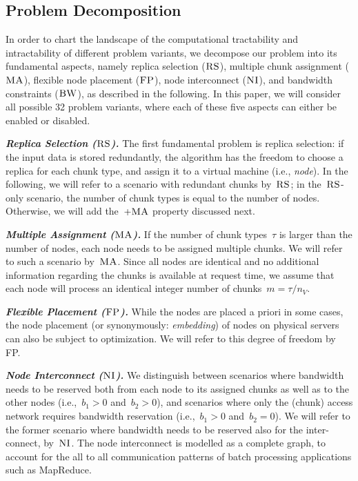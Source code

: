 \documentclass[preprint,12pt]{elsarticle}
\newcommand{\MaFactor}{m}
\newcommand{\capa}{\emph{cap}}
\newcommand{\CC}{\textsc{NI}}
\newcommand{\FP}{\textsc{FP}}
\newcommand{\RS}{\textsc{RS}}
\newcommand{\BW}{\textsc{BW}}
\newcommand{\MA}{\textsc{MA}}
\newcommand{\CostTrans}{\ensuremath{b_1}}
\newcommand{\CostCom}{\ensuremath{b_2}}
\begin{document}

\subsection{Problem Decomposition}

In order to chart the landscape of the computational tractability and intractability of different
problem variants, we decompose our problem into its fundamental aspects, namely replica selection
($\RS$), multiple chunk assignment ($\MA$), flexible node placement ($\FP$), node interconnect ($\CC$),
and bandwidth constraints ($\BW$), as described in the following. 
In this paper, we will consider all possible 32 problem variants, where each of these five aspects
can either be enabled or disabled. 

\textbf{\emph{Replica Selection ($\RS$).}} The first fundamental problem is replica selection:
if the input data is stored redundantly, the algorithm has the freedom to choose a replica
for each chunk type, and assign it to a virtual machine (i.e., \emph{node}).
In the following, we will refer to a scenario
with redundant chunks by~$\RS$; in the~$\RS$-only scenario, the number of chunk types
is equal to the number of nodes. Otherwise, we will add the~$+\MA$ property discussed next.

\textbf{\emph{Multiple Assignment ($\MA$).}}
If the number of chunk types~$\tau$ is larger than the number of nodes,
each node needs to be assigned multiple chunks. We will refer to such a scenario by~$\MA$. 
Since all nodes are identical and no additional information regarding the chunks is available at request time, we assume that each node will process an identical integer number of chunks~$\MaFactor = \tau / n_V$. 


\textbf{\emph{Flexible Placement ($\FP$).}} %
While the nodes are placed a priori in some cases, the node placement (or
synonymously: \emph{embedding}) of nodes on physical servers can also be
subject to optimization. We will refer to this degree of freedom by FP.

\textbf{\emph{Node Interconnect ($\CC$).}} We distinguish between scenarios
where bandwidth needs to be reserved
both from each node to its assigned chunks as well as to the other nodes
(i.e.,~$\CostTrans>0$ and~$\CostCom>0$), and
 scenarios where only the (chunk) access network requires bandwidth reservation (i.e.,~$\CostTrans>0$ and~$\CostCom=0$).
 We will refer to the former scenario
where bandwidth needs to be reserved also for the inter-connect, by~$\CC$. 
The node interconnect is modelled as a complete graph, to account for the all to all communication patterns of batch processing applications such as MapReduce.
\end{document}
